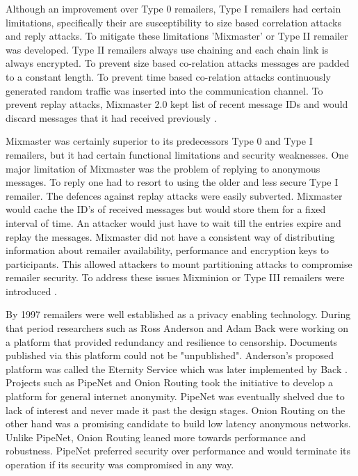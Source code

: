 \documentclass{llncs}
\begin{document}
Although an improvement over Type 0 remailers, Type I remailers had certain limitations, specifically their are susceptibility to size based correlation attacks and reply attacks. To mitigate these limitations 'Mixmaster' or Type II remailer was developed. Type II remailers always use chaining and each chain link is always encrypted. To prevent size based co-relation attacks messages are padded to a constant length. To prevent time based co-relation attacks continuously generated random traffic was inserted into the communication channel. To prevent replay attacks, Mixmaster 2.0 kept list of recent message IDs and would discard messages that it had received previously \cite{mixmaster-spec}.

Mixmaster was certainly superior to its predecessors Type 0 and Type I remailers, but it had certain functional limitations and security weaknesses. One major limitation of Mixmaster was the problem of replying to anonymous messages. To reply one had to resort to using the older and less secure Type I remailer. The defences against replay attacks were easily subverted. Mixmaster would cache the ID's of received messages but would store them for a fixed interval of time. An attacker would just have to wait till the entries expire and replay the messages. Mixmaster did not have a consistent way of distributing information about remailer availability, performance and encryption keys to participants. This allowed attackers to mount partitioning attacks to compromise remailer security. To address these issues Mixminion or Type III remailers were introduced \cite{minion-design}.

By 1997 remailers were well established as a privacy enabling technology. During that period researchers such as Ross Anderson and Adam Back were working on a platform that provided redundancy and resilience to censorship. Documents published via this platform could not be "unpublished". Anderson's proposed platform was called the Eternity Service \cite{anderson96eternity} which was later implemented by Back \cite{back:usenet}. Projects such as PipeNet\cite{pipenet10} and Onion Routing \cite{onion-routing:ih96} took the initiative to develop a platform for general internet anonymity. PipeNet was eventually shelved due to lack of interest and never made it past the design stages. Onion Routing on the other hand was a promising candidate to build low latency anonymous networks. Unlike PipeNet, Onion Routing leaned more towards performance and robustness. PipeNet preferred security over performance and would terminate its operation if its security was compromised in any way.
\end{document}
